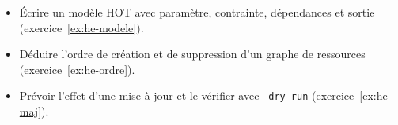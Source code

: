 \begin{savoirfaire}
\begin{itemize}
  \item Écrire un modèle HOT avec paramètre, contrainte, dépendances et sortie (exercice~\ref{ex:he-modele}).
  \item Déduire l'ordre de création et de suppression d'un graphe de ressources (exercice~\ref{ex:he-ordre}).
  \item Prévoir l'effet d'une mise à jour et le vérifier avec \texttt{--dry-run} (exercice~\ref{ex:he-maj}).
\end{itemize}
\end{savoirfaire}
